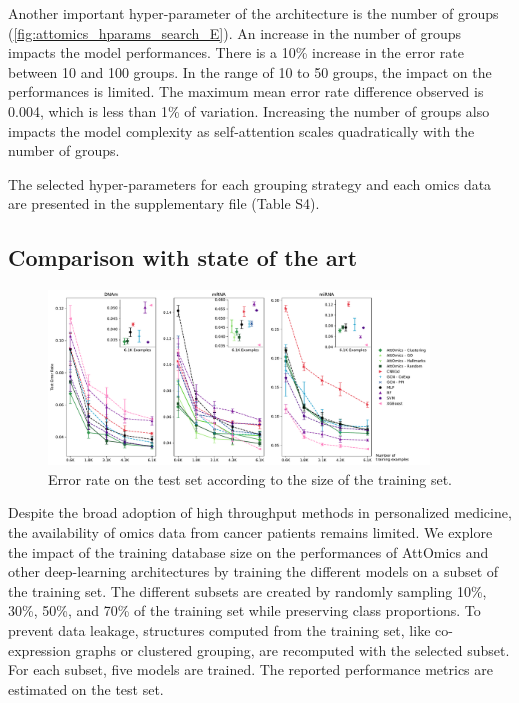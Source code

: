 \documentclass[../main.tex]{subfiles}
\begin{document}
Another important hyper-parameter of the architecture is the number of groups (\cref{fig:attomics_hparams_search_E}).
An increase in the number of groups impacts the model performances.
There is a 10\% increase in the error rate between 10 and 100 groups.
In the range of 10 to 50 groups, the impact on the performances is limited.
The maximum mean error rate difference observed is 0.004, which is less than 1\% of variation.
Increasing the number of groups also impacts the model complexity as self-attention scales quadratically with the number of groups.

The selected hyper-parameters for each grouping strategy and each omics data are presented in the supplementary file (Table S4).

\subsection{Comparison with state of the art}

\begin{figure}[htbp]
	\centering
	\includegraphics[width=0.9\textwidth]{Beaude.168.fig.3.pdf}
	\caption{Error rate on the test set according to the size of the training set.}\label{fig:limit_train_classif}
\end{figure}

Despite the broad adoption of high throughput methods in personalized medicine, the availability of omics data from cancer patients remains limited.
We explore the impact of the training database size on the performances of AttOmics and other deep-learning architectures by training the different models on a subset of the training set.
The different subsets are created by randomly sampling 10\%, 30\%, 50\%, and 70\% of the training set while preserving class proportions.
To prevent data leakage, structures computed from the training set, like co-expression graphs or clustered grouping, are recomputed with the selected subset.
For each subset, five models are trained.
The reported performance metrics are estimated on the test set.
\end{document}
